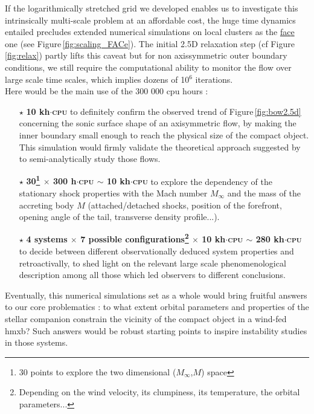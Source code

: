 \documentclass[
    a4paper, 
    12pt, onecolumn,
]{article}
\begin{document}
\indent If the logarithmically stretched grid we developed enables us to investigate this intrinsically multi-scale problem at an affordable cost, the huge time dynamics entailed precludes extended numerical simulations on local clusters as the \href{http://www.apc.univ-paris7.fr/FACe/en/cluster-arago}{{\sc fac}e} one (see Figure\,\ref{fig:scaling_FACe}). The initial 2.5D relaxation step (cf Figure\,\ref{fig:relax}) partly lifts this caveat but for non axissymmetric outer boundary conditions, we still require the computational ability to monitor the flow over large scale time scales, which implies dozens of 10$^6$ iterations.\\
\indent Here would be the main use of the 300 000 {\sc cpu} hours :\\
\begin{itemize}
\item[$\star$] \textbf{10 kh$\cdot$\textsc{cpu}} to definitely confirm the observed trend of Figure\,\ref{fig:bow2.5d} concerning the sonic surface shape of an axisymmetric flow, by making the inner boundary small enough to reach the physical size of the compact object. This simulation would firmly validate the theoretical approach suggested by \citep{Foglizzo1996} to semi-analytically study those flows.
\item[$\star$] \textbf{30\footnote{30 points to explore the two dimensional ($M_{\infty}$,$M$) space} $\times$ 300 h$\cdot$\textsc{cpu} $\sim$ 10 kh$\cdot$\textsc{cpu}} to explore the dependency of the stationary shock properties with the M{\sc ach} number $M_{\infty}$ and the mass of the accreting body $M$ (attached/detached shocks, position of the forefront, opening angle of the tail, transverse density profile...).
\item[$\star$] \textbf{4 systems $\times$ 7 possible configurations\footnote{Depending on the wind velocity, its clumpiness, its temperature, the orbital parameters...} $\times$ 10 kh$\cdot$\textsc{cpu} $\sim$ 280 kh$\cdot$\textsc{cpu}} to decide between different observationally deduced system properties and retroactivally, to shed light on the relevant large scale phenomenological description among all those which led observers to different conclusions.\\ 
\end{itemize}
\indent \indent Eventually, this numerical simulations set as a whole would bring fruitful answers to our core problematics : to what extent orbital parameters and properties of the stellar companion constrain the vicinity of the compact object in a wind-fed {\sc hmxb}? Such answers would be robust starting points to inspire instability studies in those systems.
\end{document}
